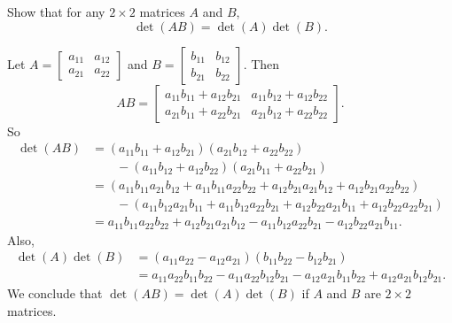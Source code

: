 \begin{example} Show that for any $2 \times 2$ matrices $A$ and $B$,
\[\det(AB) = \det(A) \det(B).\] 

\ExampleSolution

Let $A = \left[ \begin{array}{cc} a_{11}&a_{12} \\ a_{21}&a_{22} \end{array} \right]$ and $B = \left[ \begin{array}{cc} b_{11}&b_{12} \\ b_{21}&b_{22} \end{array} \right]$. Then
\[AB = \left[ \begin{array}{cc} a_{11}b_{11}+a_{12}b_{21}&a_{11}b_{12}+a_{12}b_{22} \\ a_{21}b_{11}+a_{22}b_{21}&a_{21}b_{12}+a_{22}b_{22} \end{array} \right].\]
So
\begin{align*}
\det(AB) &= (a_{11}b_{11}+a_{12}b_{21})(a_{21}b_{12}+a_{22}b_{22}) \\
	& \qquad   - (a_{11}b_{12}+a_{12}b_{22})(a_{21}b_{11}+a_{22}b_{21}) \\
	&= (a_{11}b_{11}a_{21}b_{12} + a_{11}b_{11}a_{22}b_{22} + a_{12}b_{21}a_{21}b_{12} + a_{12}b_{21}a_{22}b_{22}) \\
	& \qquad - (a_{11}b_{12}a_{21}b_{11} + a_{11}b_{12}a_{22}b_{21} +  a_{12}b_{22}a_{21}b_{11} + a_{12}b_{22}a_{22}b_{21}) \\ 
	&= a_{11}b_{11}a_{22}b_{22} + a_{12}b_{21}a_{21}b_{12} - a_{11}b_{12}a_{22}b_{21} - a_{12}b_{22}a_{21}b_{11}.
\end{align*}
Also,
\begin{align*}
\det(A) \det(B) &= (a_{11}a_{22}-a_{12}a_{21})(b_{11}b_{22}-b_{12}b_{21}) \\
	&= a_{11}a_{22}b_{11}b_{22} - a_{11}a_{22}b_{12}b_{21} - a_{12}a_{21}b_{11}b_{22} + a_{12}a_{21}b_{12}b_{21}.
\end{align*}
We conclude that $\det(AB) = \det(A) \det(B)$ if $A$ and $B$ are $2 \times 2$ matrices.

\end{example}


